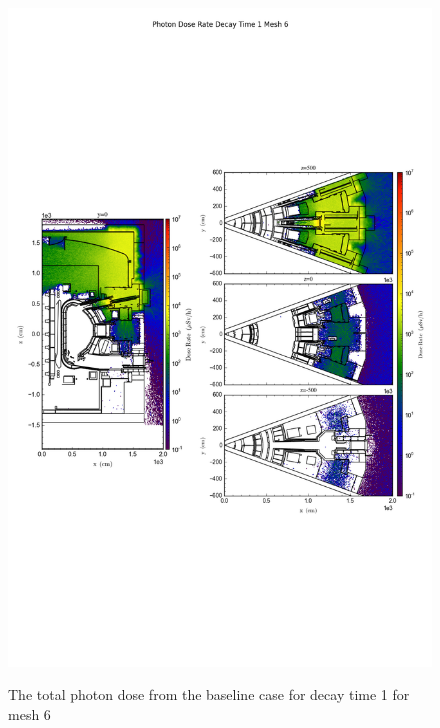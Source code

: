 \begin{figure}[ht!]
\centering
\includegraphics[trim={0cm 9cm 0cm 10cm},clip,scale=0.75]{../plots/final_model/Photon_Dose_Rate_Decay_Time_1_Mesh_6.png}
\label{fig:photons_dc1_no4bc_m6_flux}
\caption{The total photon dose from the baseline case for decay time 1 for mesh 6}
\end{figure}
